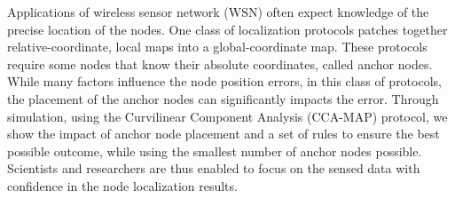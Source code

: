 Applications of wireless sensor network (WSN) often expect knowledge of the precise location of the nodes. One class of localization protocols patches together relative-coordinate, local maps into a global-coordinate map.  These protocols require some nodes that know their absolute coordinates, called anchor nodes.  While many factors influence the node position errors, in this class of protocols, the placement of the anchor nodes can significantly impacts the error.  Through simulation, using the Curvilinear Component Analysis (CCA-MAP) protocol, we show the impact of anchor node placement and a set of rules to ensure the best possible outcome, while using the smallest number of anchor nodes possible.  Scientists and researchers are thus enabled to focus on the sensed data with confidence in the node localization results.
